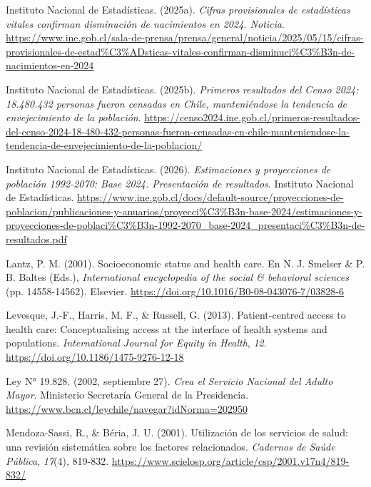\documentclass[
  spanish,
  a4paper,
  oneside]{scrbook}
\newlength{\cslhangindent}
\newenvironment{CSLReferences}[2] %
 {\begin{list}{}{%
  \setlength{\itemindent}{0pt}
  \setlength{\leftmargin}{0pt}
  \setlength{\parsep}{0pt}
  \ifodd #1
   \setlength{\leftmargin}{\cslhangindent}
   \setlength{\itemindent}{-1\cslhangindent}
  \fi
  \setlength{\itemsep}{#2\baselineskip}}}
 {\end{list}}
\begin{document}
\begin{CSLReferences}{1}{0}
Instituto Nacional de Estadísticas. (2025a). \emph{Cifras provisionales
de estadísticas vitales confirman disminución de nacimientos en 2024.
Noticia}.
\url{https://www.ine.gob.cl/sala-de-prensa/prensa/general/noticia/2025/05/15/cifras-provisionales-de-estad\%C3\%ADsticas-vitales-confirman-disminuci\%C3\%B3n-de-nacimientos-en-2024}

Instituto Nacional de Estadísticas. (2025b). \emph{Primeros resultados
del Censo 2024: 18.480.432 personas fueron censadas en Chile,
manteniéndose la tendencia de envejecimiento de la población}.
\url{https://censo2024.ine.gob.cl/primeros-resultados-del-censo-2024-18-480-432-personas-fueron-censadas-en-chile-manteniendose-la-tendencia-de-envejecimiento-de-la-poblacion/}

Instituto Nacional de Estadísticas. (2026). \emph{Estimaciones y
proyecciones de población 1992-2070: Base 2024. Presentación de
resultados}. Instituto Nacional de Estadísticas.
\url{https://www.ine.gob.cl/docs/default-source/proyecciones-de-poblacion/publicaciones-y-anuarios/proyecci\%C3\%B3n-base-2024/estimaciones-y-proyecciones-de-poblaci\%C3\%B3n-1992-2070_base-2024_presentaci\%C3\%B3n-de-resultados.pdf}

Lantz, P. M. (2001). Socioeconomic status and health care. En N. J.
Smelser \& P. B. Baltes (Eds.), \emph{International encyclopedia of the
social \& behavioral sciences} (pp. 14558-14562). Elsevier.
\url{https://doi.org/10.1016/B0-08-043076-7/03828-6}

Levesque, J.-F., Harris, M. F., \& Russell, G. (2013). Patient-centred
access to health care: {Conceptualising} access at the interface of
health systems and populations. \emph{International Journal for Equity
in Health}, \emph{12}. \url{https://doi.org/10.1186/1475-9276-12-18}

Ley N° 19.828. (2002, septiembre 27). \emph{Crea el Servicio Nacional
del Adulto Mayor}. Ministerio Secretaría General de la Presidencia.
\url{https://www.bcn.cl/leychile/navegar?idNorma=202950}

Mendoza-Sassi, R., \& Béria, J. U. (2001). Utilización de los servicios
de salud: una revisión sistemática sobre los factores relacionados.
\emph{Cadernos de Saúde Pública}, \emph{17}(4), 819-832.
\url{https://www.scielosp.org/article/csp/2001.v17n4/819-832/}


\end{CSLReferences}
\end{document}
